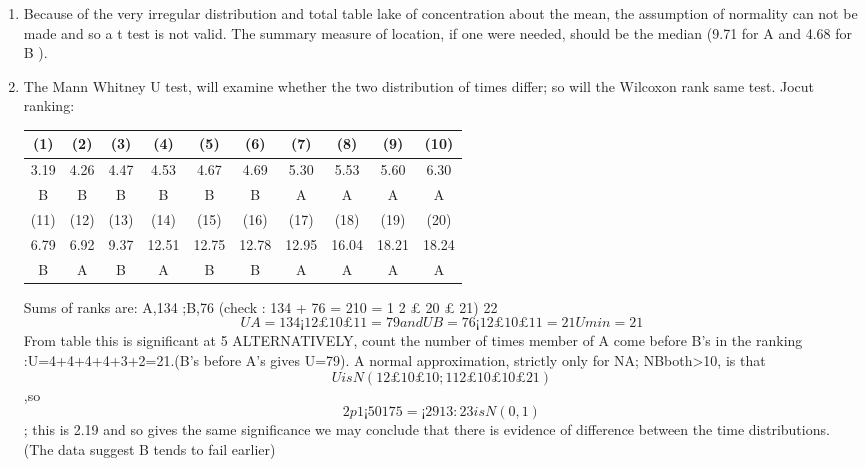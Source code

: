 \documentclass[a4paper,12pt]{article}
\begin{document}
\begin{enumerate}
\item 
Because of the very irregular distribution and total table lake of concentration
about the mean, the assumption of normality can not be made and so a t test is not
valid. The summary measure of location, if one were needed, should be the median
(9.71 for A and 4.68 for B ). 
\item The Mann Whitney U test, will examine whether the two
distribution of times differ; so will the Wilcoxon rank same test.
Jocut ranking:


\begin{tabular}{|c|c|c|c|c|c|c|c|c|c|}
\hline
(1)&(2)&(3)&(4)&(5)&(6)&(7)&(8)&(9)&(10)\\ \hline
3.19&4.26&4.47&4.53&4.67&4.69&5.30&5.53&5.60&6.30\\ \hline
B&B&B&B&B&B&A&A&A&A\\ \hline
(11)&(12)&(13)&(14)&(15)&(16)&(17)&(18)&(19)&(20)\\ \hline
6.79&6.92&9.37&12.51&12.75&12.78&12.95&16.04&18.21&18.24\\ \hline
B&A&B&A&B&B&A&A&A&A\\ \hline
\end{tabular}

Sums of ranks are: A,134 ;B,76 (check : 134 + 76 = 210 = 1
2 £ 20 £ 21)
22
\[UA = 134 ¡
1
2
£ 10 £ 11 = 79 and UB = 76 ¡
1
2
£ 10 £ 11 = 21 Umin = 21\]
From table this is significant at 5%
ALTERNATIVELY, count the number of times member of A come before B’s in the
ranking :U=4+4+4+4+3+2=21.(B’s before A’s gives U=79). A normal approximation,
strictly only for NA; NBboth>10, is that \[U is N( 1
2 £ 10 £ 10; 1
12 £ 10 £ 10 £ 21)\],so
\[2p1¡50
175 = ¡ 29
13:23 is N(0,1)\]; this is 2.19 and so gives the same significance
we may conclude that there is evidence of difference between the time distributions.
(The data suggest B tends to fail earlier)
\end{enumerate}
\end{document}
